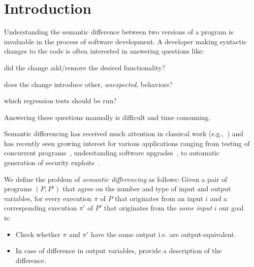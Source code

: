 \section{Introduction} 



Understanding the semantic difference between two versions of a program is invaluable in the process of software development. A developer making syntactic changes to the code is often interested in answering questions like:
\begin{inparaenum}[(i)]
\item did the change add/remove the desired functionality?
\item does the change introduce other, \emph{unexpected}, behaviors?
\item which regression tests should be run?
\end{inparaenum}
Answering these questions manually is difficult and time consuming.

Semantic differencing has received much attention in classical work (e.g.,~\cite{Horwitz90,Horwitz89,Hoare69}) and has recently seen growing interest for various applications ranging from testing of concurrent programs~\cite{ChakiGurfinkelStrichman12}, understanding software upgrades~\cite{JinOrsoXie10}, to automatic generation of security exploits~\cite{BrumleyPoosankamSongZheng08}.

We define the problem of \emph{semantic differencing} as follows: Given a pair of programs $(P,P')$ that agree on the number and type of input and output variables, for every execution $\pi$ of $P$ that originates from an input $i$ and a corresponding execution $\pi'$ of $P'$ that originates from the \emph{same input $i$} our goal is:
\begin{itemize}
\item Check whether $\pi$ and $\pi'$ have the same output i.e. are output-equivalent.
\item In case of difference in output variables, provide a description of the difference.
\end{itemize}


